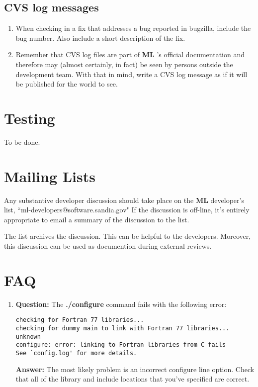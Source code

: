 \documentclass{article}[12pt]
\newcommand{\ML}     {{\bf ML }}
\begin{document}
\subsection{CVS log messages}
\begin{enumerate}
\item When checking in a fix that addresses a bug reported in bugzilla,
include the bug number.
Also include a short description of the fix.
\item Remember that CVS log files are part of \ML's official documentation and
therefore may (almost certainly, in fact) be seen by persons outside the
development team.
With that in mind, write a CVS log message as if it will be published for the
world to see.
\end{enumerate}

\section{Testing}

To be done.

\section{Mailing Lists}

Any substantive developer discussion should take place on the \ML developer's
list, ``ml-developers@software.sandia.gov"
If the discussion is off-line, it's entirely appropriate to email a summary of
the discussion to the list.

The list archives the discussion.
This can be helpful to the developers.
Moreover, this discussion can be used as documention during external
reviews.

\section{FAQ}

\begin{enumerate}
\item {\bf Question:} The {\bf ./configure} command
fails with the following error:
\begin{verbatim}
checking for Fortran 77 libraries...
checking for dummy main to link with Fortran 77 libraries... unknown
configure: error: linking to Fortran libraries from C fails
See `config.log' for more details.
\end{verbatim}
{\bf Answer:} The most likely problem is an incorrect configure line option.   Check
that all of the library and include locations that you've specified are
correct.
\end{enumerate}


\clearpage
\newpage




\end{document}
